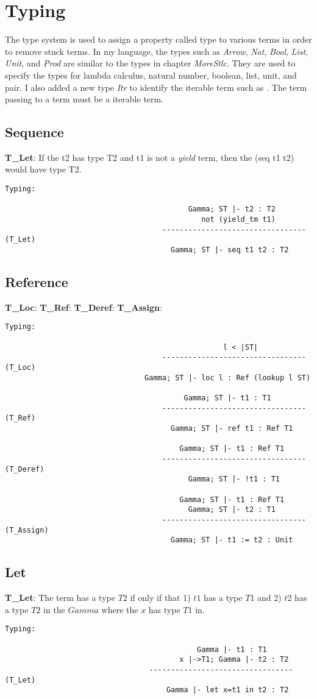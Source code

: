 \section{Typing}
\label{sec:type}
The type system is used to assign a property called type to various terms in order to remove stuck terms. 
In my language, the types such as \textit{Arrow}, \textit{Nat}, \textit{Bool}, \textit{List}, \textit{Unit}, and \textit{Prod} are similar to the types in chapter \textit{MoreStlc}.
They are used to specify the types for lambda calculus, natural number, boolean, list, unit, and pair.
I also added a new type \textit{Itr} to identify the iterable term such as \gen. 
The term passing to a \nt term must be a iterable term.

\subsection{Sequence}
\textbf{T_Let}: If the t2 has type T2 and t1 is not a \textit{yield} term, then the (seq t1 t2) would have type T2. 
\begin{lstlisting}
Typing:

										  Gamma; ST |- t2 : T2
											 not (yield_tm t1)
									---------------------------------   (T_Let)
									  Gamma; ST |- seq t1 t2 : T2
\end{lstlisting}

\subsection{Reference}
\textbf{T_Loc}: 
\textbf{T_Ref}:
\textbf{T_Deref}:
\textbf{T_Assign}:
\begin{lstlisting}
Typing:

										          l < |ST|
									---------------------------------   (T_Loc)
								Gamma; ST |- loc l : Ref (lookup l ST)

									     Gamma; ST |- t1 : T1
									---------------------------------   (T_Ref)
									  Gamma; ST |- ref t1 : Ref T1

									    Gamma; ST |- t1 : Ref T1
									---------------------------------   (T_Deref)
									      Gamma; ST |- !t1 : T1

									  	Gamma; ST |- t1 : Ref T1
										  Gamma; ST |- t2 : T1
									---------------------------------   (T_Assign)
									  Gamma; ST |- t1 := t2 : Unit
\end{lstlisting}

\subsection{Let}
\textbf{T_Let}: The \lt term has a type $T2$  if only if that 1) $t1$ has a type $T1$ and 2) $t2$ has a type $T2$ in the $Gamma$ where the $x$ has type $T1$ in.
\begin{lstlisting}
Typing:

											Gamma |- t1 : T1
										x |->T1; Gamma |- t2 : T2
								 ---------------------------------   (T_Let)
									 Gamma |- let x=t1 in t2 : T2
\end{lstlisting}

